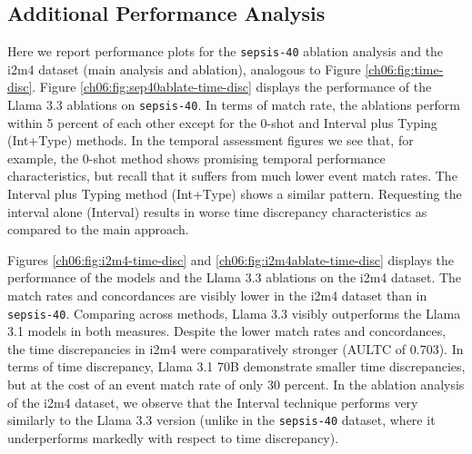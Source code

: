 \subsection{Additional Performance Analysis}\label{ch06:apd:add-perf}
Here we report performance plots for the \texttt{sepsis-40} ablation analysis and the i2m4 dataset (main analysis and ablation), analogous to Figure \ref{ch06:fig:time-disc}.
Figure \ref{ch06:fig:sep40ablate-time-disc} displays the performance of the Llama 3.3 ablations on \texttt{sepsis-40}.
In terms of match rate, the ablations perform within 5 percent of each other except for the 0-shot and Interval plus Typing (Int+Type) methods.
In the temporal assessment figures we see that, for example, the 0-shot method shows promising temporal performance characteristics, but recall that it suffers from much lower event match rates.
The Interval plus Typing method (Int+Type) shows a similar pattern.
Requesting the interval alone (Interval) results in worse time discrepancy characteristics as compared to the main approach.  





Figures \ref{ch06:fig:i2m4-time-disc} and \ref{ch06:fig:i2m4ablate-time-disc} displays the performance of the models and the Llama 3.3 ablations on the i2m4 dataset.
The match rates and concordances are visibly lower in the i2m4 dataset than in \texttt{sepsis-40}.
Comparing across methods, Llama 3.3 visibly outperforms the Llama 3.1 models in both measures.
Despite the lower match rates and concordances, the time discrepancies in i2m4 were comparatively stronger (AULTC of 0.703).
In terms of time discrepancy, Llama 3.1 70B demonstrate smaller time discrepancies, but at the cost of an event match rate of only 30 percent.
In the ablation analysis of the i2m4 dataset, we observe that the Interval technique performs very similarly to the Llama 3.3 version (unlike in the \texttt{sepsis-40} dataset, where it underperforms markedly with respect to time discrepancy).












\FloatBarrier
